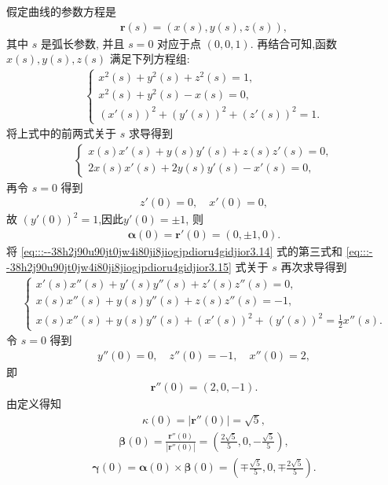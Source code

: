 \documentclass[../../main.tex]{subfiles}%
\begin{document}
\begin{solution}

假定曲线的参数方程是
\begin{align*}
\bm{r}(s) = (x(s), y(s), z(s)),
\end{align*}
其中 $s$ 是弧长参数, 并且 $s=0$ 对应于点 $(0,0,1)$. 再结合可知,函数 $x(s), y(s), z(s)$ 满足下列方程组:
\begin{align}
\begin{cases}
x^2(s) + y^2(s) + z^2(s) = 1, \\
x^2(s) + y^2(s) - x(s) = 0, \\
(x'(s))^2 + (y'(s))^2 + (z'(s))^2 = 1.
\end{cases}
\label{eq:::--38h2j90u90jt0jw4i80ji8jiogjpdioru4gidjior3.14}
\end{align}
将上式中的前两式关于 $s$ 求导得到
\begin{align}
\begin{cases}
x(s)x'(s) + y(s)y'(s) + z(s)z'(s) = 0, \\
2x(s)x'(s) + 2y(s)y'(s) - x'(s) = 0,
\end{cases}
\label{eq:::--38h2j90u90jt0jw4i80ji8jiogjpdioru4gidjior3.15}
\end{align}
再令 $s=0$ 得到
\begin{align*}
z'(0) = 0, \quad x'(0) = 0,
\end{align*}
故 $(y'(0))^2 = 1$,因此$y'(0)=\pm 1$, 则
\begin{align}
\bm{\alpha}(0) = \bm{r}'(0) = (0,\pm 1,0).
\label{eq:::--38h2j90u90jt0jw4i80ji8jiogjpdioru4gidjior3.16}
\end{align}
将 \eqref{eq:::--38h2j90u90jt0jw4i80ji8jiogjpdioru4gidjior3.14} 式的第三式和 \eqref{eq:::--38h2j90u90jt0jw4i80ji8jiogjpdioru4gidjior3.15} 式关于 $s$ 再次求导得到
\begin{align}
\begin{cases}
x'(s)x''(s) + y'(s)y''(s) + z'(s)z''(s) = 0, \\
x(s)x''(s) + y(s)y''(s) + z(s)z''(s) = -1, \\
x(s)x''(s) + y(s)y''(s) + (x'(s))^2 + (y'(s))^2 = \frac{1}{2}x''(s).
\end{cases}
\label{eq:::--38h2j90u90jt0jw4i80ji8jiogjpdioru4gidjior3.16_prime}
\end{align}
令 $s=0$ 得到
\begin{align*}
y''(0) = 0, \quad z''(0) = -1, \quad x''(0) = 2,
\end{align*}
即
\begin{align}
\bm{r}''(0) = (2,0,-1).
\label{eq:::--38h2j90u90jt0jw4i80ji8jiogjpdioru4gidjior3.17}
\end{align}
由定义得知
\begin{align*}
\kappa(0) = |\bm{r}''(0)| = \sqrt{5},
\end{align*}
\begin{align*}
\bm{\beta}(0) = \frac{\bm{r}''(0)}{|\bm{r}''(0)|} = \left(\frac{2\sqrt{5}}{5}, 0, -\frac{\sqrt{5}}{5}\right),
\end{align*}
\begin{align*}
\bm{\gamma}(0) = \bm{\alpha}(0) \times \bm{\beta}(0) = \left(\mp \frac{\sqrt{5}}{5}, 0, \mp \frac{2\sqrt{5}}{5}\right).
\end{align*}


\end{solution}
\end{document}
